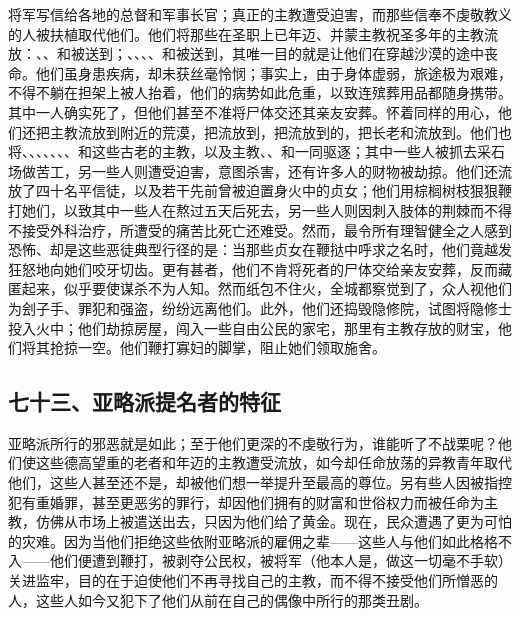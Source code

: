 将军写信给各地的总督和军事长官；真正的主教遭受迫害，而那些信奉不虔敬教义的人被扶植取代他们。他们将那些在圣职上已年迈、并蒙主教祝圣多年的主教流放：、、和被送到；、、、、和被送到，其唯一目的就是让他们在穿越沙漠的途中丧命。他们虽身患疾病，却未获丝毫怜悯；事实上，由于身体虚弱，旅途极为艰难，不得不躺在担架上被人抬着，他们的病势如此危重，以致连殡葬用品都随身携带。其中一人确实死了，但他们甚至不准将尸体交还其亲友安葬。怀着同样的用心，他们还把主教流放到附近的荒漠，把流放到，把流放到的，把长老和流放到。他们也将、、、、、、、和这些古老的主教，以及主教、、和一同驱逐；其中一些人被抓去采石场做苦工，另一些人则遭受迫害，意图杀害，还有许多人的财物被劫掠。他们还流放了四十名平信徒，以及若干先前曾被迫置身火中的贞女；他们用棕榈树枝狠狠鞭打她们，以致其中一些人在熬过五天后死去，另一些人则因刺入肢体的荆棘而不得不接受外科治疗，所遭受的痛苦比死亡还难受。然而，最令所有理智健全之人感到恐怖、却是这些恶徒典型行径的是：当那些贞女在鞭挞中呼求之名时，他们竟越发狂怒地向她们咬牙切齿。更有甚者，他们不肯将死者的尸体交给亲友安葬，反而藏匿起来，似乎要使谋杀不为人知。然而纸包不住火，全城都察觉到了，众人视他们为刽子手、罪犯和强盗，纷纷远离他们。此外，他们还捣毁隐修院，试图将隐修士投入火中；他们劫掠房屋，闯入一些自由公民的家宅，那里有主教存放的财宝，他们将其抢掠一空。他们鞭打寡妇的脚掌，阻止她们领取施舍。\par


\subsection{七十三、亚略派提名者的特征}

亚略派所行的邪恶就是如此；至于他们更深的不虔敬行为，谁能听了不战栗呢？他们使这些德高望重的老者和年迈的主教遭受流放，如今却任命放荡的异教青年取代他们，这些人甚至还不是，却被他们想一举提升至最高的尊位。另有些人因被指控犯有重婚罪，甚至更恶劣的罪行，却因他们拥有的财富和世俗权力而被任命为主教，仿佛从市场上被遣送出去，只因为他们给了黄金。现在，民众遭遇了更为可怕的灾难。因为当他们拒绝这些依附亚略派的雇佣之辈——这些人与他们如此格格不入——他们便遭到鞭打，被剥夺公民权，被将军（他本人是，做这一切毫不手软）关进监牢，目的在于迫使他们不再寻找自己的主教，而不得不接受他们所憎恶的人，这些人如今又犯下了他们从前在自己的偶像中所行的那类丑剧。\par


